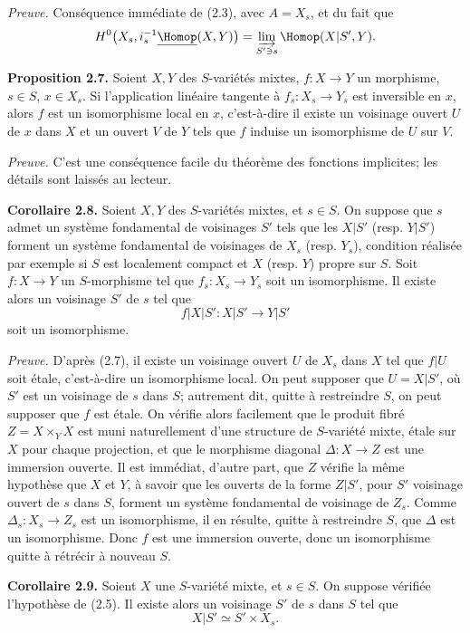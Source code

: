 \documentclass[11pt]{article}
\begin{document}
\emph{Preuve.} Conséquence immédiate de (2.3), avec $A=X_s$, et du fait que
\[
  H^0\bigl(X_s,i_s^{-1}\underline{\Homop}(X,Y)\bigr)
  =\varinjlim_{S'\ni s}\Homop(X|S',Y).
\]

\textbf{Proposition 2.7.} Soient $X,Y$ des $S$-variétés mixtes, $f:X\to Y$ un morphisme, $s\in S$, $x\in X_s$. Si l'application linéaire tangente à $f_s:X_s\to Y_s$ est inversible en $x$, alors $f$ est un isomorphisme local en $x$, c'est-à-dire il existe un voisinage ouvert $U$ de $x$ dans $X$ et un ouvert $V$ de $Y$ tels que $f$ induise un isomorphisme de $U$ sur $V$.

\emph{Preuve.} C'est une conséquence facile du théorème des fonctions implicites; les détails sont laissés au lecteur.

\textbf{Corollaire 2.8.} Soient $X,Y$ des $S$-variétés mixtes, et $s\in S$. On suppose que $s$ admet un système fondamental de voisinages $S'$ tels que les $X|S'$ (resp. $Y|S'$) forment un système fondamental de voisinages de $X_s$ (resp. $Y_s$), condition réalisée par exemple si $S$ est localement compact et $X$ (resp. $Y$) propre sur $S$. Soit $f:X\to Y$ un $S$-morphisme tel que $f_s:X_s\to Y_s$ soit un isomorphisme. Il existe alors un voisinage $S'$ de $s$ tel que
\[
  f|X|S':X|S'\longrightarrow Y|S'
\]
soit un isomorphisme.

\emph{Preuve.} D'après (2.7), il existe un voisinage ouvert $U$ de $X_s$ dans $X$ tel que $f|U$ soit étale, c'est-à-dire un isomorphisme local. On peut supposer que $U=X|S'$, où $S'$ est un voisinage de $s$ dans $S$; autrement dit, quitte à restreindre $S$, on peut supposer que $f$ est étale. On vérifie alors facilement que le produit fibré $Z=X\times_Y X$ est muni naturellement d'une structure de $S$-variété mixte, étale sur $X$ pour chaque projection, et que le morphisme diagonal $\Delta:X\to Z$ est une immersion ouverte. Il est immédiat, d'autre part, que $Z$ vérifie la même hypothèse que $X$ et $Y$, à savoir que les ouverts de la forme $Z|S'$, pour $S'$ voisinage ouvert de $s$ dans $S$, forment un système fondamental de voisinage de $Z_s$. Comme $\Delta_s:X_s\to Z_s$ est un isomorphisme, il en résulte, quitte à restreindre $S$, que $\Delta$ est un isomorphisme. Donc $f$ est une immersion ouverte, donc un isomorphisme quitte à rétrécir à nouveau $S$.

\textbf{Corollaire 2.9.} Soient $X$ une $S$-variété mixte, et $s\in S$. On suppose vérifiée l'hypothèse de (2.5). Il existe alors un voisinage $S'$ de $s$ dans $S$ tel que
\[
  X|S'\simeq S'\times X_s.
\]
\end{document}
